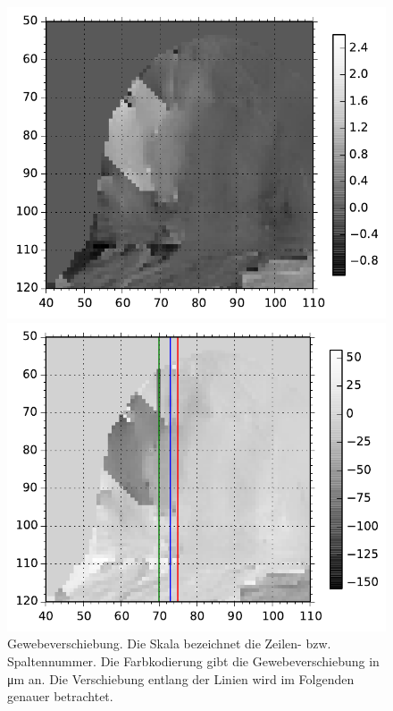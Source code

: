 \documentclass[
    11pt,
    ngerman
]{scrreprt}
\begin{document}
\begin{figure}[htbp]
    \begin{minipage}[htbp]{.48\textwidth}
        \centering
        \includegraphics[width=.9\textwidth]{Abbildungen/diff_standart_mask.pdf}
        \caption{%
            Um Phasensprünge bereinigtes Phasenbild. Die Phasenverschiebung ohne US wurde abgezogen. Die Skala bezeichnet die Zeilen- bzw. Spaltennummer. Die Farbkodierung gibt die Phasenverschiebung in Vielfachen von $2\piup$ an. 
        }
        \label{fig:prob1_unwrapped}
    \end{minipage}
    \hfill
    \begin{minipage}[htbp]{.48\textwidth}
        \centering
        \includegraphics[width=.9\textwidth]{Abbildungen/dis_standart_lines.pdf}
        \caption{%
            Gewebeverschiebung. Die Skala bezeichnet die Zeilen- bzw. Spaltennummer. Die Farbkodierung gibt die Gewebeverschiebung in \si{\micro\meter} an. Die Verschiebung entlang der Linien wird im Folgenden genauer betrachtet.
        }
        \label{fig:prob1_displacement}
    \end{minipage}
\end{figure}
\end{document}
